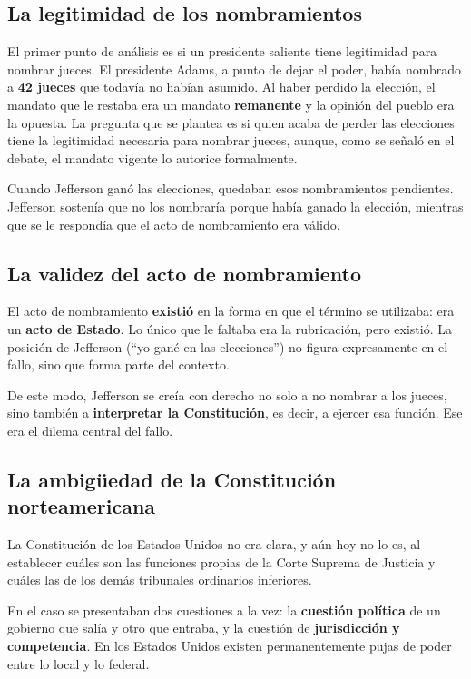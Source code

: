 \documentclass[12pt,oneside,a4paper]{book}
\begin{document}
\subsection{La legitimidad de los nombramientos}

El primer punto de análisis es si un presidente saliente tiene legitimidad para nombrar jueces. El presidente Adams, a punto de dejar el poder, había nombrado a \textbf{42 jueces} que todavía no habían asumido. Al haber perdido la elección, el mandato que le restaba era un mandato \textbf{remanente} y la opinión del pueblo era la opuesta. La pregunta que se plantea es si quien acaba de perder las elecciones tiene la legitimidad necesaria para nombrar jueces, aunque, como se señaló en el debate, el mandato vigente lo autorice formalmente.

Cuando Jefferson ganó las elecciones, quedaban esos nombramientos pendientes. Jefferson sostenía que no los nombraría porque había ganado la elección, mientras que se le respondía que el acto de nombramiento era válido.

\subsection{La validez del acto de nombramiento}

El acto de nombramiento \textbf{existió} en la forma en que el término se utilizaba: era un \textbf{acto de Estado}. Lo único que le faltaba era la rubricación, pero existió. La posición de Jefferson (``yo gané en las elecciones'') no figura expresamente en el fallo, sino que forma parte del contexto.

De este modo, Jefferson se creía con derecho no solo a no nombrar a los jueces, sino también a \textbf{interpretar la Constitución}, es decir, a ejercer esa función. Ese era el dilema central del fallo.

\subsection{La ambigüedad de la Constitución norteamericana}

La Constitución de los Estados Unidos no era clara, y aún hoy no lo es, al establecer cuáles son las funciones propias de la Corte Suprema de Justicia y cuáles las de los demás tribunales ordinarios inferiores.

En el caso se presentaban dos cuestiones a la vez: la \textbf{cuestión política} de un gobierno que salía y otro que entraba, y la cuestión de \textbf{jurisdicción y competencia}. En los Estados Unidos existen permanentemente pujas de poder entre lo local y lo federal.
\end{document}
